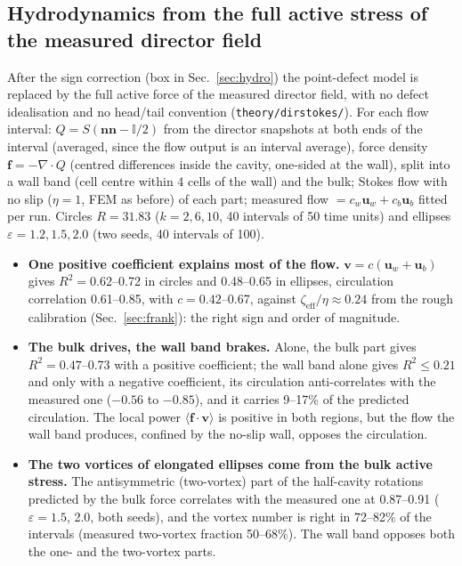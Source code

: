 \subsection{Hydrodynamics from the full active stress of the measured director field}\label{sec:dirstokes}
After the sign correction (box in Sec.~\ref{sec:hydro}) the point-defect model is replaced by the full active force of the measured director
field, with no defect idealisation and no head/tail convention (\texttt{theory/dirstokes/}). For each flow interval: $Q=S(\mathbf n\mathbf n-\mathbb I/2)$
from the director snapshots at both ends of the interval (averaged, since the flow output is an interval average), force density $\mathbf f=-\nabla\!\cdot Q$
(centred differences inside the cavity, one-sided at the wall), split into a wall band (cell centre within 4 cells of the wall) and the bulk;
Stokes flow with no slip ($\eta=1$, FEM as before) of each part; measured flow $=c_w\mathbf u_w+c_b\mathbf u_b$ fitted per run. Circles
$R=31.83$ ($k=2,6,10$, 40 intervals of 50 time units) and ellipses $\varepsilon=1.2,1.5,2.0$ (two seeds, 40 intervals of 100).
\begin{itemize}
  \item \textbf{One positive coefficient explains most of the flow.} $\mathbf v=c(\mathbf u_w+\mathbf u_b)$ gives $R^2=0.62$--0.72 in circles and
        0.48--0.65 in ellipses, circulation correlation 0.61--0.85, with $c=0.42$--0.67, against $\zeta_\mathrm{eff}/\eta\approx0.24$ from the rough
        calibration (Sec.~\ref{sec:frank}): the right sign and order of magnitude.
  \item \textbf{The bulk drives, the wall band brakes.} Alone, the bulk part gives $R^2=0.47$--0.73 with a positive coefficient; the wall band alone
        gives $R^2\le0.21$ and only with a negative coefficient, its circulation anti-correlates with the measured one ($-0.56$ to $-0.85$), and it carries
        9--17\% of the predicted circulation. The local power $\langle\mathbf f\cdot\mathbf v\rangle$ is positive in both regions, but the flow the wall
        band produces, confined by the no-slip wall, opposes the circulation.
  \item \textbf{The two vortices of elongated ellipses come from the bulk active stress.} The antisymmetric (two-vortex) part of the half-cavity
        rotations predicted by the bulk force correlates with the measured one at 0.87--0.91 ($\varepsilon=1.5$, 2.0, both seeds), and the vortex number is
        right in 72--82\% of the intervals (measured two-vortex fraction 50--68\%). The wall band opposes both the one- and the two-vortex parts.
\end{itemize}
